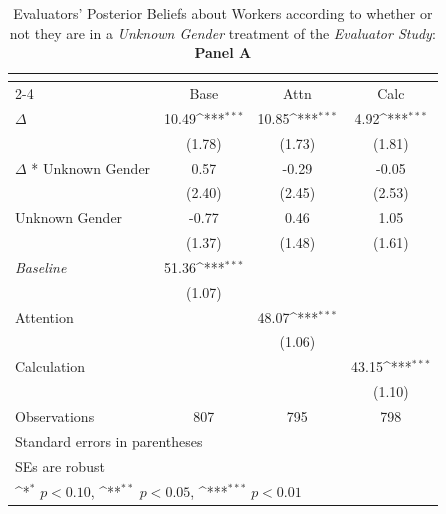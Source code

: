 \begin{table}[htbp]\centering
\def\sym#1{\ifmmode^{#1}\else\(^{#1}\)\fi}
\caption{Evaluators' Posterior Beliefs about Workers according to whether or not they are in a \textit{Unknown Gender} treatment of the \textit{Evaluator Study}: \textbf{Panel A}}
\begin{tabular}{l*{3}{c}}
\hline\hline
                &\multicolumn{3}{c}{}                                    \\\cmidrule(lr){2-4}
                &\multicolumn{1}{c}{Base}&\multicolumn{1}{c}{Attn}&\multicolumn{1}{c}{Calc}\\
\hline
$\Delta$        &    10.49\sym{***}&    10.85\sym{***}&     4.92\sym{***}\\
                &   (1.78)         &   (1.73)         &   (1.81)         \\
$\Delta$ * Unknown Gender&     0.57         &    -0.29         &    -0.05         \\
                &   (2.40)         &   (2.45)         &   (2.53)         \\
Unknown Gender  &    -0.77         &     0.46         &     1.05         \\
                &   (1.37)         &   (1.48)         &   (1.61)         \\
\textit{Baseline}&    51.36\sym{***}&                  &                  \\
                &   (1.07)         &                  &                  \\
Attention       &                  &    48.07\sym{***}&                  \\
                &                  &   (1.06)         &                  \\
Calculation     &                  &                  &    43.15\sym{***}\\
                &                  &                  &   (1.10)         \\
\hline
Observations    &      807         &      795         &      798         \\
\hline\hline
\multicolumn{4}{l}{\footnotesize Standard errors in parentheses}\\
\multicolumn{4}{l}{\footnotesize SEs are robust}\\
\multicolumn{4}{l}{\footnotesize \sym{*} \(p<0.10\), \sym{**} \(p<0.05\), \sym{***} \(p<0.01\)}\\
\end{tabular}
\end{table}
